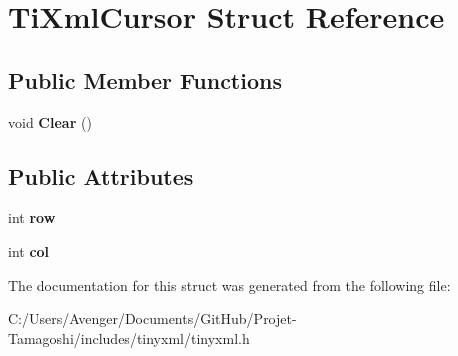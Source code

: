 \hypertarget{struct_ti_xml_cursor}{\section{Ti\+Xml\+Cursor Struct Reference}
\label{struct_ti_xml_cursor}
}
\subsection*{Public Member Functions}
\begin{DoxyCompactItemize}
\item 
\hypertarget{struct_ti_xml_cursor_a1e6fa622b59dafb71b6efe595105dcdd}{void {\bfseries Clear} ()}\label{struct_ti_xml_cursor_a1e6fa622b59dafb71b6efe595105dcdd}

\end{DoxyCompactItemize}
\subsection*{Public Attributes}
\begin{DoxyCompactItemize}
\item 
\hypertarget{struct_ti_xml_cursor_a5b54dd949820c2db061e2be41f3effb3}{int {\bfseries row}}\label{struct_ti_xml_cursor_a5b54dd949820c2db061e2be41f3effb3}

\item 
\hypertarget{struct_ti_xml_cursor_a5694d7ed2c4d20109d350c14c417969d}{int {\bfseries col}}\label{struct_ti_xml_cursor_a5694d7ed2c4d20109d350c14c417969d}

\end{DoxyCompactItemize}


The documentation for this struct was generated from the following file\+:\begin{DoxyCompactItemize}
\item 
C\+:/\+Users/\+Avenger/\+Documents/\+Git\+Hub/\+Projet-\/\+Tamagoshi/includes/tinyxml/tinyxml.\+h\end{DoxyCompactItemize}
